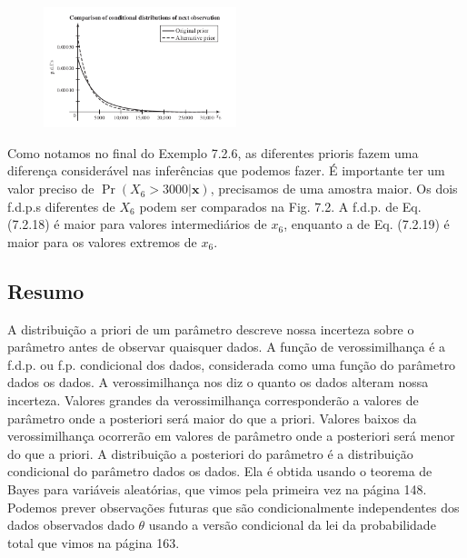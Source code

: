 \vspace{1cm}

\begin{figure}[H]

\centering

\includegraphics[width=0.5\textwidth]{img/7_2/img_2.png}


\end{figure}
\vspace{1cm}

Como notamos no final do Exemplo 7.2.6, as diferentes prioris fazem uma diferença considerável nas inferências que podemos fazer. É importante ter um valor preciso de $\Pr(X_6 > 3000|\mathbf{x})$, precisamos de uma amostra maior. Os dois f.d.p.s diferentes de $X_6$ podem ser comparados na Fig. 7.2. A f.d.p. de Eq. (7.2.18) é maior para valores intermediários de $x_6$, enquanto a de Eq. (7.2.19) é maior para os valores extremos de $x_6$.

\subsection*{Resumo}
A distribuição a priori de um parâmetro descreve nossa incerteza sobre o parâmetro antes de observar quaisquer dados. A função de verossimilhança é a f.d.p. ou f.p. condicional dos dados, considerada como uma função do parâmetro dados os dados. A verossimilhança nos diz o quanto os dados alteram nossa incerteza. Valores grandes da verossimilhança corresponderão a valores de parâmetro onde a posteriori será maior do que a priori. Valores baixos da verossimilhança ocorrerão em valores de parâmetro onde a posteriori será menor do que a priori. A distribuição a posteriori do parâmetro é a distribuição condicional do parâmetro dados os dados. Ela é obtida usando o teorema de Bayes para variáveis aleatórias, que vimos pela primeira vez na página 148. Podemos prever observações futuras que são condicionalmente independentes dos dados observados dado $\theta$ usando a versão condicional da lei da probabilidade total que vimos na página 163.

